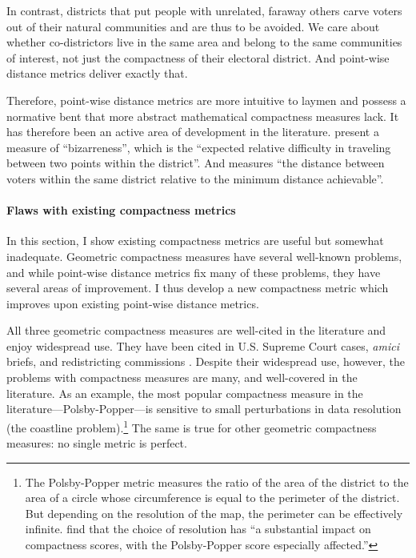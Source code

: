 \documentclass[]{article}
\let\oldparagraph\paragraph
\renewcommand{\paragraph}[1]{\oldparagraph{#1}\mbox{}}
\begin{document}
In contrast, districts that put people with unrelated, faraway others
carve voters out of their natural communities and are thus to be
avoided. We care about whether co-districtors live in the same area and
belong to the same communities of interest, not just the compactness of
their electoral district. And point-wise distance metrics deliver
exactly that.

Therefore, point-wise distance metrics are more intuitive to laymen and
possess a normative bent that more abstract mathematical compactness
measures lack. It has therefore been an active area of development in
the literature. \cite{cm2010} present a measure of ``bizarreness'',
which is the ``expected relative difficulty in traveling between two
points within the district''. And \cite{fh2011} measures ``the distance
between voters within the same district relative to the minimum distance
achievable''.

\hypertarget{flaws-with-existing-compactness-metrics}{%
\paragraph{Flaws with existing compactness
metrics}\label{flaws-with-existing-compactness-metrics}}

In this section, I show existing compactness metrics are useful but
somewhat inadequate. Geometric compactness measures have several
well-known problems, and while point-wise distance metrics fix many of
these problems, they have several areas of improvement. I thus develop a
new compactness metric which improves upon existing point-wise distance
metrics.

All three geometric compactness measures are well-cited in the
literature and enjoy widespread use. They have been cited in U.S.
Supreme Court cases, \emph{amici} briefs, and redistricting commissions
\citep{moncrief2011}. Despite their widespread use, however, the
problems with compactness measures are many, and well-covered in the
literature. As an example, the most popular compactness measure in the
literature---Polsby-Popper---is sensitive to small perturbations in data
resolution (the coastline problem).\footnote{The Polsby-Popper metric
  measures the ratio of the area of the district to the area of a circle
  whose circumference is equal to the perimeter of the district. But
  depending on the resolution of the map, the perimeter can be
  effectively infinite. \citeauthor{bswp} find that the choice of
  resolution has ``a substantial impact on compactness scores, with the
  Polsby-Popper score especially affected.''} The same is true for other
geometric compactness measures: no single metric is perfect.
\end{document}
